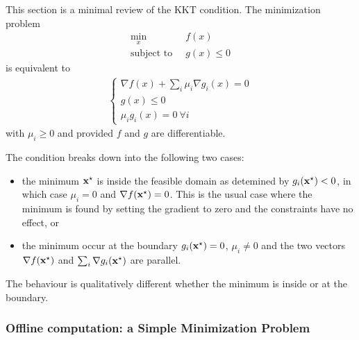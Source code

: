 This section is a minimal review of the KKT condition. The minimization problem
\begin{align*}
  \min_x &\ f(x) \\
  \text{subject to } &\ g(x) \le 0
\end{align*}
is equivalent to
\begin{align*}
  \begin{cases}
    \nabla f(x) + \sum_i \mu_i \nabla g_i(x) = 0 \\
    g(x) \le 0 \\
    \mu_i g_i(x) = 0\ \forall i
  \end{cases}
\end{align*}
with $\mu_i\ge 0$ and provided $f$ and $g$ are differentiable.

The condition breaks down into the following two cases:
\begin{itemize}
\item the minimum $\boldsymbol{\mathrm{x}}^\star$ is inside the feasible domain as   detemined by $g_i(\boldsymbol{\mathrm{x}}^\star) < 0$, in which case $\mu_i=0$ and   $\nabla f(\boldsymbol{\mathrm{x}}^\star) = 0$. This is the usual case where the minimum   is found by setting the gradient to zero and the constraints have no   effect, or
\item the minimum occur at the boundary $g_i(\boldsymbol{\mathrm{x}}^\star) = 0$,   $\mu_i\neq 0$ and the two vectors $\nabla f(\boldsymbol{\mathrm{x}}^\star)$ and   $\sum_i \nabla g_i(\boldsymbol{\mathrm{x}}^\star)$ are parallel.
\end{itemize}
The behaviour is qualitatively different whether the minimum is inside or at the boundary.


\subsubsection{Offline computation: a Simple Minimization Problem}

